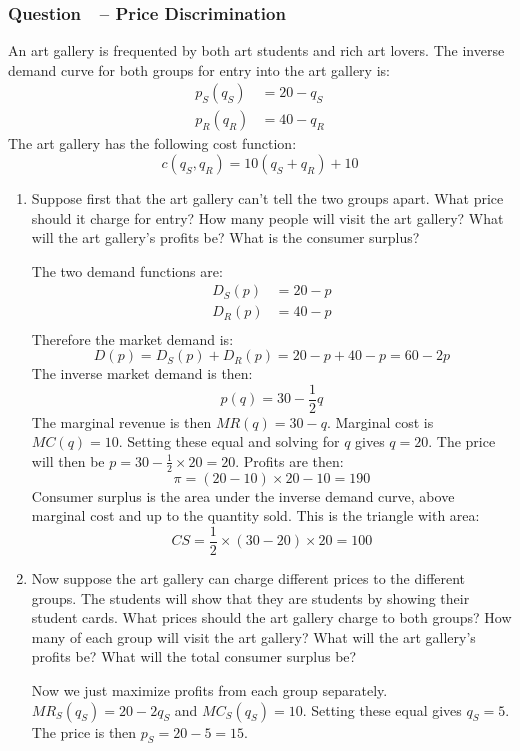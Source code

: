 \documentclass[12pt]{article}
\newcounter{question}[section]
\newcommand{\question}[1]{\refstepcounter{question}
  \subsubsection*{Question~\thequestion~-- #1}}
\newenvironment{subquestions}{
  \begin{enumerate}[label=(\roman*)]}{\end{enumerate}}
\begin{document}
\question{Price Discrimination}
An art gallery is frequented by both art students and rich art lovers.
The inverse demand curve for both groups for entry into the art gallery is:
\begin{align*}
  p_S\left( q_S \right) &= 20-q_S \\
  p_R\left( q_R \right) &= 40-q_R
\end{align*}
The art gallery has the following cost function:
\[
  c\left( q_S,q_R \right)=10\left(q_S + q_R\right) +10
\]
\begin{subquestions}
  \item Suppose first that the art gallery can't tell the
    two groups apart. What price should it charge for entry? How many people
    will visit the art gallery? What will the art gallery's profits be?
    What is the consumer surplus?

    \textcolor{solution-color}{
      The two demand functions are:
      \begin{align*}
        D_S\left( p \right)&=20-p \\
        D_R\left( p \right)&=40-p \\
      \end{align*}
      Therefore the market demand is:
      \[
        D\left( p \right)=D_S\left( p \right)+D_R\left( p
        \right)=20-p+40-p=60-2p
      \]
      The inverse market demand is then:
      \[
        p\left( q \right)=30-\frac{1}{2}q
      \]
      The marginal revenue is then $MR\left( q \right)=30-q$. Marginal cost is
      $MC\left( q \right)=10$. Setting these equal and solving for $q$ gives
      $q=20$. The price will then be $p=30-\frac{1}{2}\times 20=20$.
      Profits are then:
      \[
        \pi=\left( 20-10 \right)\times 20 - 10 = 190
      \]
      Consumer surplus is the area under the inverse demand curve, above
      marginal cost and up to the quantity sold. This is the triangle with
      area:
      \[
        CS=\frac{1}{2}\times\left( 30-20 \right)\times 20=100
      \]
    }
  \item Now suppose the art gallery can charge different
    prices to the different groups. The students will show that they are
    students by showing their student cards. What prices should the art gallery
    charge to both groups? How many of each group will visit the art gallery?
    What will the art gallery's profits be?  What will the total consumer
    surplus be?

    \textcolor{solution-color}{
      Now we just maximize profits from each group separately. $MR_S\left( q_S
      \right)=20-2q_S$ and $MC_S\left( q_S \right)=10$. Setting these equal
      gives $q_S=5$. The price is then $p_S=20-5=15$.
    }


\end{subquestions}
\end{document}

